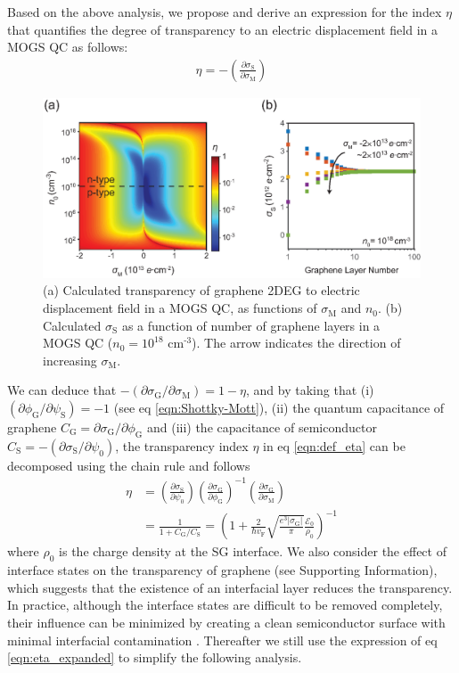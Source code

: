 \documentclass[journal=nalefd]{achemso}
\newcommand*\subs[1]{_{\text{#1}}} %
\newcommand*\sups[1]{^{\text{#1}}} %
\newcommand*\change[1]{{#1}}
\begin{document}
Based on the above analysis, we propose and derive an expression for the index $\eta$ that quantifies the degree of transparency to an electric displacement field in a MOGS QC as follows:
\begin{align}
    \eta = -(\frac{\partial \sigma\subs{S}}{\partial \sigma\subs{M}})
    \label{eqn:def_eta}
\end{align}
\begin{figure}[htbp]
  \includegraphics[width=0.9\linewidth]{img/FIG3.eps}
  \caption{(a) Calculated transparency of graphene 2DEG to electric displacement field in a MOGS QC, as functions of $\sigma\subs{M}$ and $n_0$. 
  \change{(b) Calculated $\sigma\subs{S}$ as a function of number of graphene layers in a MOGS QC ($n\subs{0}=10^{18}$ cm$\sups{-3}$). The arrow indicates the direction of increasing $\sigma\subs{M}$.}
  }
  \label{fig:transparency-MOGS}
\end{figure}
We can deduce that $-(\partial \sigma\subs{G} / \partial \sigma\subs{M})=1-\eta$, and by taking that (i) $(\partial \phi\subs{G}/\partial \psi\subs{S})=-1$ (see eq \ref{eqn:Shottky-Mott}), (ii) the quantum capacitance of graphene $C\subs{G}=\partial \sigma\subs{G} / \partial \phi\subs{G}$ and (iii) the capacitance of semiconductor $C\subs{S}  = -(\partial \sigma\subs{S}/ \partial \psi_0)$, the transparency index $\eta$ in eq \ref{eqn:def_eta} can be decomposed using the chain rule and follows
\begin{equation}
  \label{eqn:eta_expanded}
    \begin{aligned}
      \eta &= \left(\frac{\partial \sigma\subs{S}}{\partial \psi_0}\right) \left(\frac{\partial \sigma\subs{G}}{\partial \phi\subs{G}}\right)^{-1} \left(\frac{\partial \sigma\subs{G}}{\partial \sigma\subs{M}}\right)\\
          &= \frac{1}{1+C\subs{G}/C\subs{S}}= (1+\frac{2}{\hbar v\subs{F}} \sqrt{\frac{e^3 |\sigma\subs{G}|}{\pi}}\frac{\mathscr{E}_0}{\rho_0})^{-1}
    \end{aligned}
\end{equation}
where $\rho_0$ is the charge density at the SG interface.
\change{
We also consider the effect of interface states on the transparency of graphene (see Supporting Information), 
which suggests that the existence of an interfacial layer reduces the transparency.
In practice, although the interface states are difficult to be removed completely, their influence can be minimized by creating a clean semiconductor surface with minimal interfacial contamination \cite{withers2015light}.
Thereafter we still use the expression of eq \ref{eqn:eta_expanded} to simplify the following analysis. 
}
\end{document}
